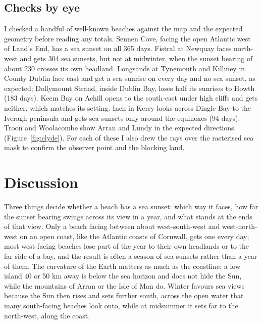 \documentclass[11pt,a4paper]{article}
\begin{document}
\subsection{Checks by eye}
I checked a handful of well-known beaches against the map and the expected geometry before reading any totals. Sennen Cove, facing the open Atlantic west of Land's End, has a sea sunset on all 365 days. Fistral at Newquay faces north-west and gets 304 sea sunsets, but not at midwinter, when the sunset bearing of about 230\textdegree{} crosses its own headland. Longsands at Tynemouth and Killiney in County Dublin face east and get a sea sunrise on every day and no sea sunset, as expected; Dollymount Strand, inside Dublin Bay, loses half its sunrises to Howth (183 days). Keem Bay on Achill opens to the south-east under high cliffs and gets neither, which matches its setting. Inch in Kerry looks across Dingle Bay to the Iveragh peninsula and gets sea sunsets only around the equinoxes (94 days). Troon and Woolacombe show Arran and Lundy in the expected directions (Figure~\ref{fig:clyde}). For each of these I also drew the rays over the rasterised sea mask to confirm the observer point and the blocking land.

\section{Discussion}
Three things decide whether a beach has a sea sunset: which way it faces, how far the sunset bearing swings across its view in a year, and what stands at the ends of that view. Only a beach facing between about west-south-west and west-north-west on an open coast, like the Atlantic coasts of Cornwall, gets one every day; most west-facing beaches lose part of the year to their own headlands or to the far side of a bay, and the result is often a season of sea sunsets rather than a year of them. The curvature of the Earth matters as much as the coastline: a low island 40 or 50 km away is below the sea horizon and does not hide the Sun, while the mountains of Arran or the Isle of Man do. Winter favours sea views because the Sun then rises and sets further south, across the open water that many south-facing beaches look onto, while at midsummer it sets far to the north-west, along the coast.
\end{document}
